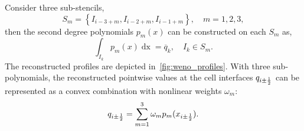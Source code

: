 Consider three sub-stencils,
\begin{equation}\label{eq:weno_substencils}
    S_{m} = \left\{ I_{i - 3 + m}, I_{i - 2 + m}, I_{i - 1 + m} \right\}, \quad
    m = 1, 2, 3,
\end{equation}
then the second degree polynomials \( p_{m} (x) \) can be constructed on each \( S_{m} \) as,
\begin{equation}\label{eq:weno_subpoly}
    \int_{I_{k}} p_{m} (x) \mathop{dx} = \overline{q}_{k}, \quad I_{k} \in S_{m}.
\end{equation}
The reconstructed profiles are depicted in~\cref{fig:weno_profiles}.
With three sub-polynomials, the reconstructed pointwise values at the cell interfaces \( q_{i \pm \frac{1}{2}} \)
can be represented as a convex combination with nonlinear weights \( \omega_{m} \):
\begin{equation}\label{eq:weno_convex_comb}
    q_{i \pm \frac{1}{2}} = \sum_{m=1}^{3} \omega_{m} p_{m} (x_{i \pm \frac{1}{2}}).
\end{equation}


